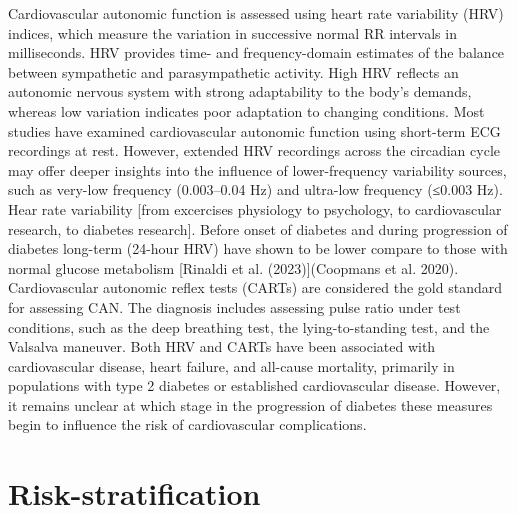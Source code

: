 \documentclass[
  a4paper,
  headsepline=true,
  open=any]{scrbook}
\begin{document}
Cardiovascular autonomic function is assessed using heart rate
variability (HRV) indices, which measure the variation in successive
normal RR intervals in milliseconds. HRV provides time- and
frequency-domain estimates of the balance between sympathetic and
parasympathetic activity. High HRV reflects an autonomic nervous system
with strong adaptability to the body's demands, whereas low variation
indicates poor adaptation to changing conditions. Most studies have
examined cardiovascular autonomic function using short-term ECG
recordings at rest. However, extended HRV recordings across the
circadian cycle may offer deeper insights into the influence of
lower-frequency variability sources, such as very-low frequency
(0.003--0.04 Hz) and ultra-low frequency (≤0.003 Hz). Hear rate
variability {[}from excercises physiology to psychology, to
cardiovascular research, to diabetes research{]}. Before onset of
diabetes and during progression of diabetes long-term (24-hour HRV) have
shown to be lower compare to those with normal glucose metabolism
{[}Rinaldi et al. (2023){]}(Coopmans et al. 2020). Cardiovascular
autonomic reflex tests (CARTs) are considered the gold standard for
assessing CAN. The diagnosis includes assessing pulse ratio under test
conditions, such as the deep breathing test, the lying-to-standing test,
and the Valsalva maneuver. Both HRV and CARTs have been associated with
cardiovascular disease, heart failure, and all-cause mortality,
primarily in populations with type 2 diabetes or established
cardiovascular disease. However, it remains unclear at which stage in
the progression of diabetes these measures begin to influence the risk
of cardiovascular complications.


\hypertarget{risk-stratification}{%
\chapter{Risk-stratification}\label{risk-stratification}}
\end{document}

